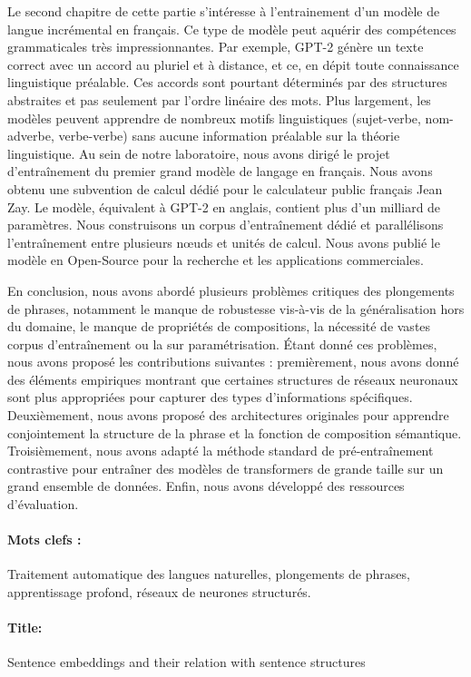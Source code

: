 Le second chapitre de cette partie s’intéresse à l’entrainement d’un modèle de langue incrémental en français. Ce type de modèle peut aquérir des compétences grammaticales très impressionnantes. Par exemple, GPT-2 génère un texte correct avec un accord au pluriel et à distance, et ce, en dépit toute connaissance linguistique préalable. Ces accords sont pourtant déterminés par des structures abstraites et pas seulement par l'ordre linéaire des mots. Plus largement, les modèles peuvent apprendre de nombreux motifs linguistiques (sujet-verbe, nom-adverbe, verbe-verbe) sans aucune information préalable sur la théorie linguistique. Au sein de notre laboratoire, nous avons dirigé le projet d'entraînement du premier grand modèle de langage en français. Nous avons obtenu une subvention de calcul dédié pour le calculateur public français Jean Zay. Le modèle, équivalent à GPT-2 en anglais, contient plus d'un milliard de paramètres. Nous construisons un corpus d'entraînement dédié et parallélisons l'entraînement entre plusieurs nœuds et unités de calcul. Nous avons publié le modèle en Open-Source pour la recherche et les applications commerciales.

En conclusion, nous avons abordé plusieurs problèmes critiques des plongements de phrases, notamment le manque de robustesse vis-à-vis de la généralisation hors du domaine, le manque de propriétés de compositions, la nécessité de vastes corpus d'entraînement ou la sur paramétrisation. Étant donné ces problèmes, nous avons proposé les contributions suivantes : premièrement, nous avons donné des éléments empiriques montrant que certaines structures de réseaux neuronaux sont plus appropriées pour capturer des types d'informations spécifiques.  Deuxièmement, nous avons proposé des architectures originales pour apprendre conjointement la structure de la phrase et la fonction de composition sémantique. Troisièmement, nous avons adapté la méthode standard de pré-entraînement contrastive pour entraîner des modèles de transformers de grande taille sur un grand ensemble de données. Enfin, nous avons développé des ressources d'évaluation. 

\paragraph{Mots clefs :} Traitement automatique des langues naturelles, plongements de phrases, apprentissage profond, réseaux de neurones structurés.


\newpage

\paragraph{Title:} Sentence embeddings and their relation with sentence structures

